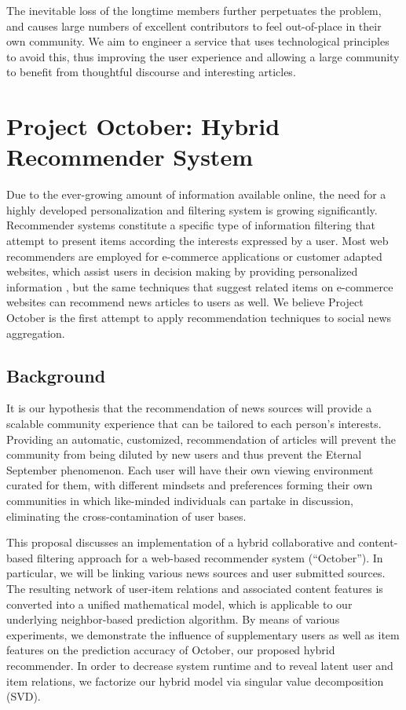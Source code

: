 \documentclass[11pt,letterpaper]{article}
\begin{document}
The inevitable loss of the longtime members further perpetuates the problem, and causes large numbers of excellent contributors to feel out-of-place in their own community.
We aim to engineer a service that uses technological principles to avoid this, thus improving the user experience and allowing a large community to benefit from thoughtful discourse and interesting articles. \\

\newpage


\section{Project October: Hybrid Recommender System}

Due to the ever-growing amount of information available online, the need for a highly developed personalization and filtering system is growing significantly.
Recommender systems constitute a specific type of information filtering that
attempt to present items according the interests expressed by a user\cite{adom}.
Most web recommenders are employed for e-commerce applications or customer
adapted websites, which assist users in decision making by providing
personalized information \cite{linden}, but the same techniques that
suggest related items on e-commerce websites can recommend news articles to users as well.
We believe Project October is the first attempt to apply recommendation techniques to social news aggregation.

\subsection{Background}
It is our hypothesis that the recommendation of news sources will provide a scalable community experience that can be tailored to each person's interests.
Providing an automatic, customized, recommendation of articles will prevent the community from being diluted by new users and thus prevent the Eternal September phenomenon.
Each user will have their own viewing environment curated for them, with different mindsets and preferences forming their own communities in which like-minded individuals can partake in discussion, eliminating the cross-contamination of user bases.

This proposal discusses an implementation of a hybrid collaborative and content-based filtering approach for a web-based recommender system (``October'').
In particular, we will be linking various news sources and user submitted sources.
The resulting network of user-item relations and associated content features is converted into a unified mathematical model, which is applicable to our underlying neighbor-based prediction algorithm.
By means of various experiments, we demonstrate the influence of supplementary users as well as item features on the prediction accuracy of October, our proposed hybrid recommender. In order to decrease system runtime and to reveal latent user and item relations, we factorize our hybrid model via singular value decomposition (SVD).
\end{document}
